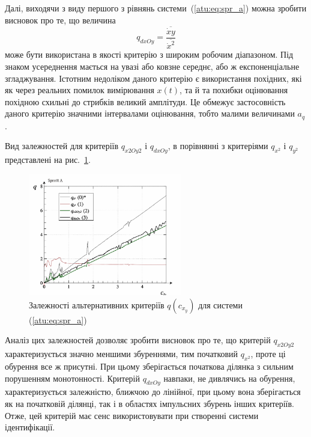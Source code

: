 Далі, виходячи з виду першого з рівнянь системи~(\ref{atu:eq:spr_a})
можна зробити висновок про те, що величина
%
\begin{equation}
  q_{dxOy} =
  \frac{\overline{\dot{x}y}}{\overline{\dot{x}^2}}
  \label{atu:eq:spr_a_q_dxyOdx2}
\end{equation}
%
може бути використана в якості критерію з широким робочим
діапазоном. Під знаком усереднення мається на увазі або ковзне
середнє, або ж експоненціальне згладжування. Істотним недоліком
даного критерію є використання похідних, які як через реальних
помилок вимірювання
$ x (t) $, та й та похибки оцінювання похідною схильні до стрибків
великий амплітуди. Це обмежує застосовність даного критерію
значними інтервалами оцінювання, тобто малими величинами
$ a_q $.

Вид залежностей для критеріїв
$ q_{x2Oy2} $ і
$ q_{dxOy} $, в порівнянні з критеріями
$ q_{x^2} $ і
$ q_{y^2} $ представлені на рис.~\ref{atu:f:spr_a_q_alt}.

\begin{figure}[htb!]
\centerline{
  \includegraphics[width=0.60\textwidth]{p/cha/spr_a/sprott_a_q2-p_c_x_y2.png}
}
\caption{Залежності альтернативних критеріїв $ q (c_{x_y}) $ для системи (\ref{atu:eq:spr_a})}
\label{atu:f:spr_a_q_alt}
\end{figure}

Аналіз цих залежностей дозволяє зробити висновок про те, що
критерій
$ q_{x2Oy2} $ характеризується значно меншими збуреннями, тим
початковий
$ q_{x^2} $, проте ці обурення все ж присутні. При цьому зберігається
початкова ділянка з сильним порушенням монотонності. Критерій
$ q_{dxOy} $ навпаки, не дивлячись на обурення, характеризується
залежністю, ближчою до лінійної, при цьому вона зберігається
як на початковій ділянці, так і в областях імпульсних збурень
інших критеріїв. Отже, цей критерій має сенс використовувати
при створенні системи ідентифікації.

